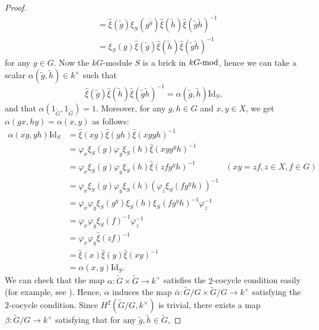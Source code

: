 \documentclass[pdftex,a4paper]{article}
\numberwithin{equation}{subsection}
\theoremstyle{definition}
\newcommand{\lmod}{\operatorname{\mathrm{\hspace{-2pt}-mod}}}
\newcommand{\Id}{\mathrm{Id}}
\begin{document}
\begin{proof}
\begin{align}
		 & =\hat{\xi}(\tilde{g})\xi_S(g^{\tilde{g}})\hat{\xi}(\tilde{h})\hat{\xi}(\tilde{g}\tilde{h})^{-1}          \\
		 & =\xi_S(g)\hat{\xi}(\tilde{g})\hat{\xi}(\tilde{h})\hat{\xi}(\tilde{g}\tilde{h})^{-1}
	\end{align}
	for any \(g\in G\). Now the \(kG\)-module \(S\) is a brick in \(kG\lmod\), hence we can take a scalar \(\alpha(\tilde{g},\tilde{h})\in k^\times\) such that
	\begin{equation}
		\hat{\xi}(\tilde{g})\hat{\xi}(\tilde{h})\hat{\xi}(\tilde{g}\tilde{h})^{-1}=\alpha(\tilde{g},\tilde{h})\Id_S,
	\end{equation}
	and that \(\alpha(1_{\tilde{G}},1_{\tilde{G}})=1\).
	Moreover, for any \(g,h\in G\) and \(x,y \in X\), we get \(\alpha(gx,hy)=\alpha(x,y)\) as follows:
	\begin{align}
		\alpha(xg,yh)\Id_S
		 & =\hat{\xi}(xg)\hat{\xi}(yh)\hat{\xi}(xgyh)^{-1}                                                \\
		 & =\varphi_x\xi_S(g)\varphi_y\xi_S(h)\hat{\xi}(xyg^yh)^{-1}                                      \\
		 & =\varphi_x\xi_S(g)\varphi_y\xi_S(h)\hat{\xi}(zfg^yh)^{-1}            & (xy=zf, z\in X, f\in G) \\
		 & =\varphi_x\xi_S(g)\varphi_y\xi_S(h)(\varphi_z\xi_S(fg^yh))^{-1}                                \\
		 & =\varphi_x\varphi_y\xi_S(g^y)\xi_S(h)\xi_S(fg^yh)^{-1}\varphi_z^{-1}                           \\
		 & =\varphi_x\varphi_y\xi_S(f)^{-1}\varphi_z^{-1}                                                 \\
		 & =\varphi_x\varphi_y\hat{\xi}(zf)^{-1}                                                          \\
		 & =\hat{\xi}(x)\hat{\xi}(y)\hat{\xi}(xy)^{-1}                                                    \\
		 & =\alpha(x,y)\Id_S.
	\end{align}
	We can check that the map \(\alpha\colon \tilde{G}\times\tilde{G}\rightarrow k^\times\) satisfies the \(2\)-cocycle condition easily (for example, see \cite{MR998775}).
	Hence, \(\alpha\) induces the map \(\bar{\alpha}\colon \tilde{G}/G\times\tilde{G}/G\rightarrow k^\times\) satisfying the \(2\)-cocycle condition.
	Since \(H^2(\tilde{G}/G,k^\times)\) is trivial, there exists a map \(\beta\colon \tilde{G}/G\rightarrow k^\times\) satisfying that for any \(\tilde{g}, \tilde{h}\in \tilde{G}\),

\end{proof}
\end{document}
